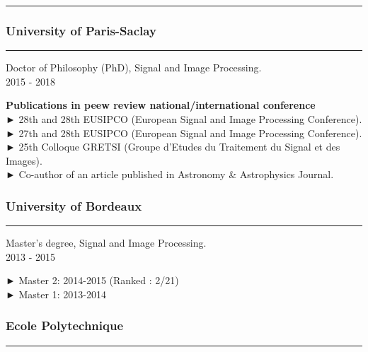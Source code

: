 \documentclass[
]{article}
\begin{document}
\begin{center}\rule{0.5\linewidth}{\linethickness}\end{center}

\hypertarget{university-of-paris-saclay}{%
\subsubsection{University of
Paris-Saclay}\label{university-of-paris-saclay}}

\begin{center}\rule{0.5\linewidth}{\linethickness}\end{center}

Doctor of Philosophy (PhD), Signal and Image Processing.\\
2015 - 2018

\textbf{Publications in peew review national/international conference}\\
► 28th and 28th EUSIPCO (European Signal and Image Processing
Conference).\\
► 27th and 28th EUSIPCO (European Signal and Image Processing
Conference).\\
► 25th Colloque GRETSI (Groupe d'Etudes du Traitement du Signal et des
Images).\\
► Co-author of an article published in Astronomy \& Astrophysics
Journal.

\hypertarget{university-of-bordeaux}{%
\subsubsection{University of Bordeaux}\label{university-of-bordeaux}}

\begin{center}\rule{0.5\linewidth}{\linethickness}\end{center}

Master's degree, Signal and Image Processing.\\
2013 - 2015

► Master 2: 2014-2015 (Ranked : 2/21)\\
► Master 1: 2013-2014

\hypertarget{ecole-polytechnique}{%
\subsubsection{Ecole Polytechnique}\label{ecole-polytechnique}}

\begin{center}\rule{0.5\linewidth}{\linethickness}\end{center}
\end{document}
